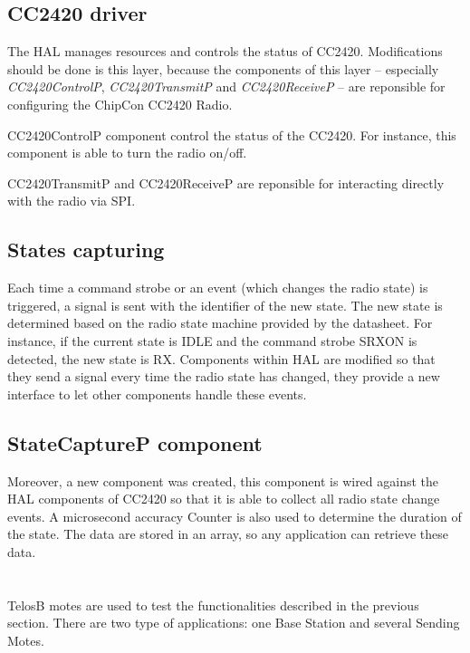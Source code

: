 \documentclass[a4paper,11pt]{article}
\begin{document}
  \subsection{CC2420 driver}

The HAL manages resources and controls the status of CC2420. Modifications should be done is this layer, because the components of this layer -- especially \emph{CC2420ControlP}, \emph{CC2420TransmitP} and \emph{CC2420ReceiveP} -- are reponsible for configuring the ChipCon CC2420 Radio.

CC2420ControlP component control the status of the CC2420. For instance, this component is able to turn the radio on/off.

CC2420TransmitP and CC2420ReceiveP are reponsible for interacting directly with the radio via SPI.

  \subsection{States capturing}

Each time a command strobe or an event (which changes the radio state) is triggered, a signal is sent with the identifier of the new state. The new state is determined based on the radio state machine provided by the datasheet. For instance, if the current state is IDLE and the command strobe SRXON is detected, the new state is RX.
Components within HAL are modified so that they send a signal every time the radio state has changed, they provide a new interface to let other components handle these events.

  \subsection{StateCaptureP component}

Moreover, a new component was created, this component is wired against the HAL components of CC2420 so that it is able to collect all radio state change events. A microsecond accuracy Counter is also used to determine the duration of the state. The data are stored in an array, so any application can retrieve these data.

\section{}

TelosB motes are used to test the functionalities described in the previous section. There are two type of applications: one Base Station and several Sending Motes.
\end{document}
